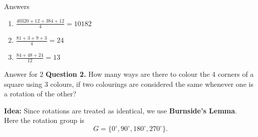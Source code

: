 \begin{frame}{Answers}
  \begin{enumerate}
    \item $\frac{40320 + 12 + 384 + 12}{4} = 10182$
    \item $\frac{81+3+9+3}{4} = 24$
    \item $\frac{84 + 48 + 24}{12} = 13$
  \end{enumerate}
\end{frame}

\begin{frame}{Answer for 2}
  \textcolor{sqt-question}{
    \textbf{Question 2.}
    How many ways are there to colour the 4 corners of a square using 3 colours,
    if two colourings are considered the same whenever one is a rotation of the other?
  }

  \vspace{0.8em}

  \begin{center}
  \end{center}

  \vspace{0.6em}

  \textbf{Idea:}
  Since rotations are treated as identical, we use \textbf{Burnside's Lemma}.\\

  Here the rotation group is
  \[
    G=\{0^\circ,90^\circ,180^\circ,270^\circ\}.
  \]
\end{frame}

